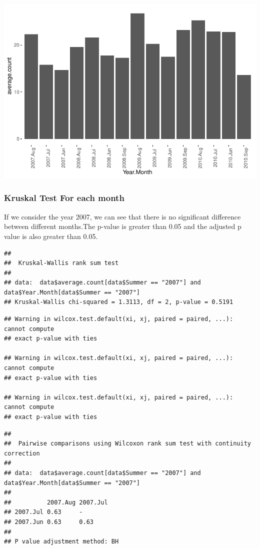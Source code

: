 \documentclass[
]{article}
\begin{document}
\includegraphics{Statistical-analysis-in-RStudio_files/figure-latex/unnamed-chunk-12-1.pdf}

\hypertarget{kruskal-test-for-each-month}{%
\subsubsection{Kruskal Test For each
month}\label{kruskal-test-for-each-month}}

If we consider the year 2007, we can see that there is no significant
difference between different months.The p-value is greater than 0.05 and
the adjusted p value is also greater than 0.05.

\begin{verbatim}
## 
##  Kruskal-Wallis rank sum test
## 
## data:  data$average.count[data$Summer == "2007"] and data$Year.Month[data$Summer == "2007"]
## Kruskal-Wallis chi-squared = 1.3113, df = 2, p-value = 0.5191
\end{verbatim}

\begin{verbatim}
## Warning in wilcox.test.default(xi, xj, paired = paired, ...): cannot compute
## exact p-value with ties

## Warning in wilcox.test.default(xi, xj, paired = paired, ...): cannot compute
## exact p-value with ties

## Warning in wilcox.test.default(xi, xj, paired = paired, ...): cannot compute
## exact p-value with ties
\end{verbatim}

\begin{verbatim}
## 
##  Pairwise comparisons using Wilcoxon rank sum test with continuity correction 
## 
## data:  data$average.count[data$Summer == "2007"] and data$Year.Month[data$Summer == "2007"] 
## 
##          2007.Aug 2007.Jul
## 2007.Jul 0.63     -       
## 2007.Jun 0.63     0.63    
## 
## P value adjustment method: BH
\end{verbatim}
\end{document}
